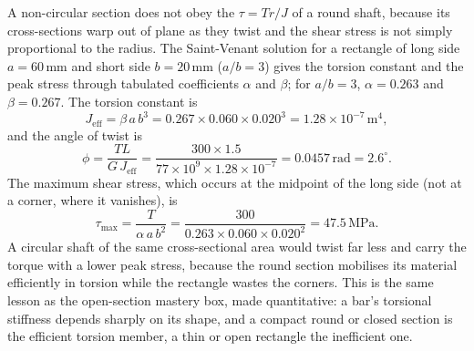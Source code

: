 A non-circular section does not obey the $\tau = Tr/J$ of a round
shaft, because its cross-sections warp out of plane as they twist and
the shear stress is not simply proportional to the radius. The
Saint-Venant solution for a rectangle of long side $a = 60\,\si{\milli
\meter}$ and short side $b = 20\,\si{\milli\meter}$ ($a/b = 3$) gives
the torsion constant and the peak stress through tabulated coefficients
$\alpha$ and $\beta$; for $a/b = 3$, $\alpha = 0.263$ and $\beta =
0.267$. The torsion constant is
\[
J_{\text{eff}} = \beta\,a\,b^3 = 0.267 \times 0.060 \times 0.020^3
= 1.28 \times 10^{-7}\,\si{\meter\tothe{4}},
\]
and the angle of twist is
\[
\phi = \frac{T L}{G\,J_{\text{eff}}}
= \frac{300 \times 1.5}{77 \times 10^9 \times 1.28 \times 10^{-7}}
= 0.0457\,\text{rad} = 2.6^{\circ}.
\]
The maximum shear stress, which occurs at the midpoint of the long side
(not at a corner, where it vanishes), is
\[
\tau_{\max} = \frac{T}{\alpha\,a\,b^2}
= \frac{300}{0.263 \times 0.060 \times 0.020^2}
= 47.5\,\text{MPa}.
\]
A circular shaft of the same cross-sectional area would twist far less
and carry the torque with a lower peak stress, because the round
section mobilises its material efficiently in torsion while the
rectangle wastes the corners. This is the same lesson as the open-section
mastery box, made quantitative: a bar's torsional stiffness depends
sharply on its shape, and a compact round or closed section is the
efficient torsion member, a thin or open rectangle the inefficient one.

